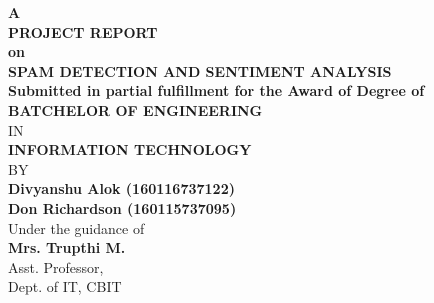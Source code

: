 \begin{titlepage}

\newcommand{\HRule}{\rule{\linewidth}{0.5mm}} %


\center %
 

{\Large \bfseries A}\\[0.45cm] %

{ \Large \bfseries PROJECT REPORT }\\[0.30cm] %
{ \Large \bfseries on}\\[0.45cm]
{ \LARGE \bfseries SPAM DETECTION AND SENTIMENT ANALYSIS}\\[0.55cm]
\vspace{0.25in}
{ \Large \bfseries Submitted in partial fulfillment for the Award of Degree of}\\[0.35cm]
{ \Large \bfseries BATCHELOR OF ENGINEERING}\\[0.35cm]
{\Large IN}\\[0.35cm]
{ \Large \bfseries INFORMATION TECHNOLOGY}\\[0.35cm]
{\Large BY}\\[0.3cm]
{ \large \bfseries Divyanshu Alok (160116737122)}\\[0.1cm]
{ \large \bfseries Don Richardson (160115737095)}\\[1cm]

\center
{\Large Under the guidance of}\\[0.3cm]
{\Large \bfseries Mrs. Trupthi M.}\\
{\Large Asst. Professor,}\\
{\Large Dept. of IT, CBIT}\\
\vspace{0.35in}




\end{titlepage}
